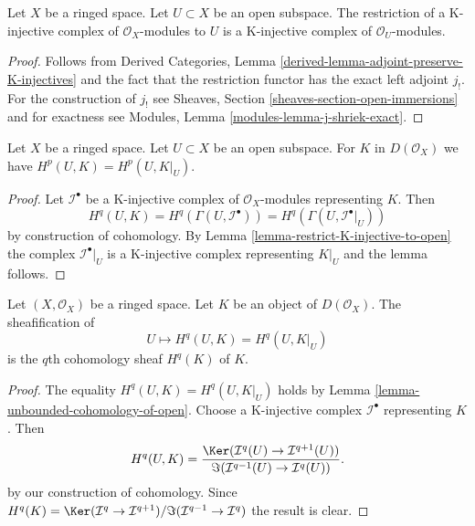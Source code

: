 \begin{lemma}
\label{lemma-restrict-K-injective-to-open}
Let $X$ be a ringed space. Let $U \subset X$ be an open subspace.
The restriction of a K-injective complex of $\mathcal{O}_X$-modules
to $U$ is a K-injective complex of $\mathcal{O}_U$-modules.
\end{lemma}

\begin{proof}
Follows from
Derived Categories, Lemma \ref{derived-lemma-adjoint-preserve-K-injectives}
and the fact that the restriction functor has the
exact left adjoint $j_!$.
For the construction of $j_!$ see
Sheaves, Section \ref{sheaves-section-open-immersions}
and for exactness see Modules, Lemma \ref{modules-lemma-j-shriek-exact}.
\end{proof}

\begin{lemma}
\label{lemma-unbounded-cohomology-of-open}
Let $X$ be a ringed space. Let $U \subset X$ be an open subspace.
For $K$ in $D(\mathcal{O}_X)$ we have
$H^p(U, K) = H^p(U, K|_U)$.
\end{lemma}

\begin{proof}
Let $\mathcal{I}^\bullet$ be a K-injective complex of $\mathcal{O}_X$-modules
representing $K$. Then
$$
H^q(U, K) = H^q(\Gamma(U, \mathcal{I}^\bullet)) =
H^q(\Gamma(U, \mathcal{I}^\bullet|_U))
$$
by construction of cohomology. By Lemma \ref{lemma-restrict-K-injective-to-open}
the complex $\mathcal{I}^\bullet|_U$ is a K-injective complex
representing $K|_U$ and the lemma follows.
\end{proof}

\begin{lemma}
\label{lemma-sheafification-cohomology}
Let $(X, \mathcal{O}_X)$ be a ringed space. Let $K$ be an object of
$D(\mathcal{O}_X)$. The sheafification of
$$
U \mapsto H^q(U, K) = H^q(U, K|_U)
$$
is the $q$th cohomology sheaf $H^q(K)$ of $K$.
\end{lemma}

\begin{proof}
The equality $H^q(U, K) = H^q(U, K|_U)$ holds by
Lemma \ref{lemma-unbounded-cohomology-of-open}.
Choose a K-injective complex $\mathcal{I}^\bullet$ representing $K$.
Then
$$
H^q(U, K) =
\frac{\Ker(\mathcal{I}^q(U) \to \mathcal{I}^{q + 1}(U))}
{\Im(\mathcal{I}^{q - 1}(U) \to \mathcal{I}^q(U))}.
$$
by our construction of cohomology. Since
$H^q(K) = \Ker(\mathcal{I}^q \to \mathcal{I}^{q + 1})/
\Im(\mathcal{I}^{q - 1} \to \mathcal{I}^q)$ the result is clear.
\end{proof}

